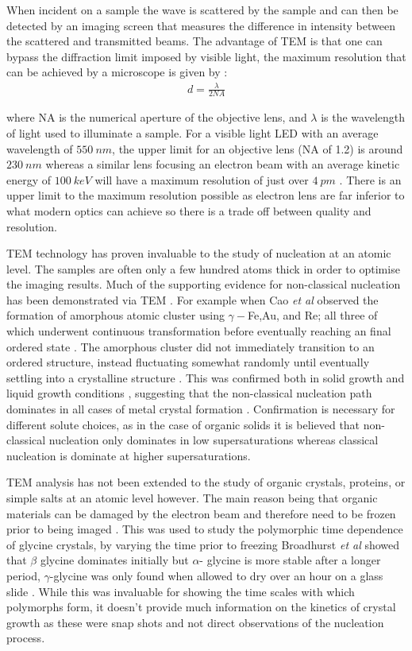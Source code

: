 \noindent
When incident on a sample the wave is scattered by the sample 
and can then be detected by an imaging screen that measures 
the difference in intensity between the scattered and 
transmitted beams. The advantage of TEM is that one can bypass
the diffraction limit imposed by visible light, the maximum 
resolution that can be achieved by a microscope is given by
\cite{Champness2020}:
\begin{align}
	d = \frac{\lambda}{2NA}
\end{align} 

\noindent
where NA is the numerical aperture of the objective lens, and
$\lambda$ is the wavelength of light used to illuminate a sample.
For a visible light LED with an average wavelength of $550~nm$, 
the upper limit for an objective lens (NA of 1.2) is around 
$230~nm$ whereas a similar lens focusing an electron beam 
with an average kinetic energy of $100~keV$ will have a maximum 
resolution of just over $4~pm$ \cite{Champness2020}. There is
an upper limit to the maximum resolution possible as electron 
lens are far inferior to what modern optics can achieve 
\cite{Champness2020} so there is a trade off between quality and 
resolution. 

TEM technology has proven invaluable to the study of nucleation
at an atomic level. The samples are often only a few hundred 
atoms thick in order to optimise the imaging results. Much of 
the supporting evidence for non-classical nucleation has been 
demonstrated via TEM \cite{Ye2023}. For example when Cao 
\textit{et al} observed the formation of amorphous atomic 
cluster using $\gamma-$Fe,Au, and Re; all three of which 
underwent continuous transformation before eventually 
reaching an final ordered state \cite{Cao2020}. The amorphous 
cluster did not immediately transition to an ordered structure, 
instead fluctuating somewhat randomly until eventually settling 
into a crystalline structure \cite{Cao2020}. This was confirmed 
both in solid growth and liquid growth conditions \cite{Cao2020, 
Loh2016}, suggesting that the non-classical nucleation path 
dominates in all cases of metal crystal formation \cite{Ye2023}. 
Confirmation is necessary for different solute choices, as in 
the case of organic solids it is believed that non-classical 
nucleation only dominates in low supersaturations whereas 
classical nucleation is dominate at higher supersaturations.

TEM analysis has not been extended to the study of organic 
crystals, proteins, or simple salts at an atomic level 
however. The main reason being that organic materials can be 
damaged by the electron beam and therefore need to be frozen 
prior to being imaged \cite{Champness2020}. This was used to 
study the polymorphic time dependence of glycine crystals, by 
varying the time prior to freezing Broadhurst \textit{et al} 
showed that $\beta$ glycine dominates initially but $\alpha$-
glycine is more stable after a longer period, $\gamma$-glycine 
was only found when allowed to dry over an hour on a glass slide \cite{Broadhurst2020}. While this was invaluable for showing 
the time scales with which polymorphs form, it doesn't provide 
much information on the kinetics of crystal growth as these 
were snap shots and not direct observations of the nucleation 
process.

